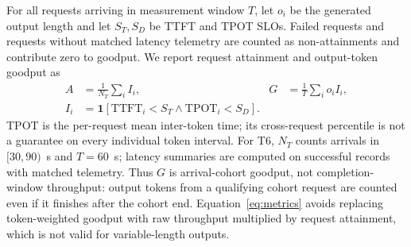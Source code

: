 For all requests arriving in measurement window $T$, let $o_i$ be the generated
output length and let $S_T,S_D$ be TTFT and TPOT SLOs. Failed requests and
requests without matched latency telemetry are counted as non-attainments and
contribute zero to goodput.
We report request attainment and output-token goodput as
\begin{equation}
 \begin{aligned}
 A&=\frac{1}{N_T}\sum_i I_i,
 &G&=\frac{1}{T}\sum_i o_i I_i,\\[-1pt]
 I_i&=\mathbf{1}[\mathrm{TTFT}_i<S_T\land\mathrm{TPOT}_i<S_D].
 \end{aligned}
 \label{eq:metrics}
\end{equation}
TPOT is the per-request mean inter-token time; its cross-request percentile is
not a guarantee on every individual token interval. For T6, $N_T$ counts
arrivals in $[30,90)$~s and $T=60$~s; latency summaries are computed on
successful records with matched telemetry. Thus $G$ is arrival-cohort goodput,
not completion-window throughput: output tokens from a qualifying cohort
request are counted even if it finishes after the cohort end. Equation~\ref{eq:metrics} avoids
replacing token-weighted goodput with raw throughput multiplied by request
attainment, which is not valid for variable-length outputs.
